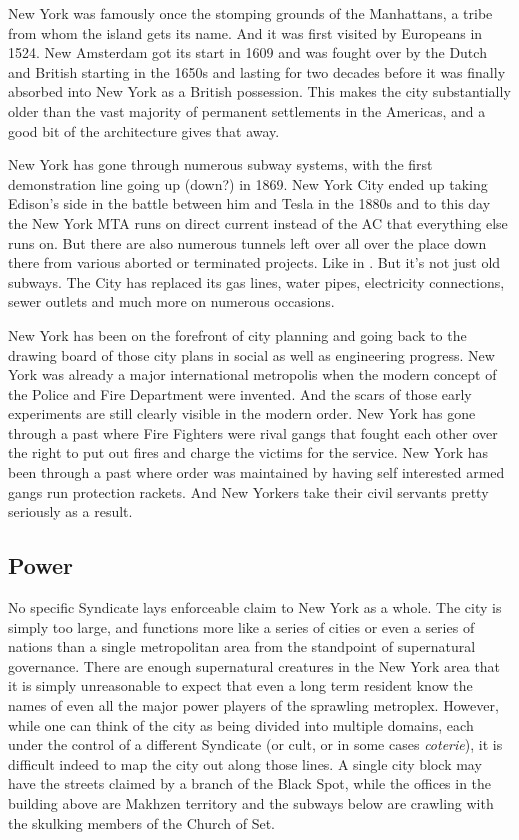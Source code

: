 New York was famously once the stomping grounds of the Manhattans, a tribe from whom the island gets its name. And it was first visited by Europeans in 1524. New Amsterdam got its start in 1609 and was fought over by the Dutch and British starting in the 1650s and lasting for two decades before it was finally absorbed into New York as a British possession. This makes the city substantially older than the vast majority of permanent settlements in the Americas, and a good bit of the architecture gives that away.

New York has gone through numerous subway systems, with the first demonstration line going up (down?) in 1869. New York City ended up taking Edison's side in the battle between him and Tesla in the 1880s and to this day the New York MTA runs on direct current instead of the AC that everything else runs on. But there are also numerous tunnels left over all over the place down there from various aborted or terminated projects. Like in . But it's not just old subways. The City has replaced its gas lines, water pipes, electricity connections, sewer outlets and much more on numerous occasions. 

New York has been on the forefront of city planning and going back to the drawing board of those city plans in social as well as engineering progress. New York was already a major international metropolis when the modern concept of the Police and Fire Department were invented. And the scars of those early experiments are still clearly visible in the modern order. New York has gone through a past where Fire Fighters were rival gangs that fought each other over the right to put out fires and charge the victims for the service. New York has been through a past where order was maintained by having self interested armed gangs run protection rackets. And New Yorkers take their civil servants pretty seriously as a result.

\subsection{Power}

\hspace{\parindent} No specific Syndicate lays enforceable claim to New York as a whole. The city is simply too large, and functions more like a series of cities or even a series of nations than a single metropolitan area from the standpoint of supernatural governance.  There are enough supernatural creatures in the New York area that it is simply unreasonable to expect that even a long term resident know the names of even all the major power players of the sprawling metroplex. However, while one can think of the city as being divided into multiple domains, each under the control of a different Syndicate (or cult, or in some cases \textit{coterie}), it is difficult indeed to map the city out along those lines. A single city block may have the streets claimed by a branch of the Black Spot, while the offices in the building above are Makhzen territory and the subways below are crawling with the skulking members of the Church of Set.

